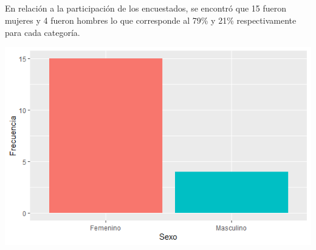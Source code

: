 \documentclass{beamer}
\begin{document}
\subsection{}
\begin{frame}{}
\vspace{-0.9\baselineskip}
\begin{tcolorbox}[colback=backframe_color,colframe=beamer_color,title= ] 
En relación a la participación de los encuestados, se encontró que 15 fueron mujeres y 4 fueron hombres lo que corresponde al 79\% y 21\% respectivamente para cada categoría.  

\includegraphics[width=0.9\linewidth]{special_figures/Rplot02.png}
    
\end{tcolorbox}
\end{frame}



\end{document}
